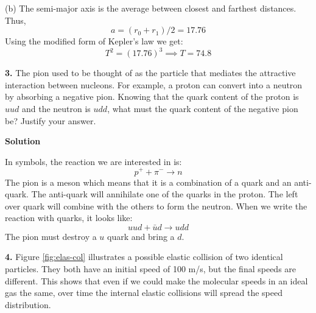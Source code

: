 \documentclass{article}
\begin{document}
(b) The semi-major axis is the average between closest and farthest
distances. Thus,
%
\begin{equation*}
a = (r_0 + r_1) / 2 = 17.76
\end{equation*}
Using the modified form of Kepler's law we get:
%
\begin{equation*}
T^2 = (17.76)^3 \implies T = 74.8
\end{equation*}

\textbf{3.}
\quad The pion used to be thought of as the particle that mediates the
attractive interaction between nucleons. For example, a proton can
convert into a neutron by absorbing a negative pion. Knowing that the
quark content of the proton is $uud$ and the neutron is
$udd$, what must the quark content of the negative pion be?
Justify your answer.
\par \textbf{Solution}
\par In symbols, the reaction we are interested in is:
%
\begin{equation*}
p^+ + \pi^- \rightarrow n
\end{equation*}
The pion is a meson which means that it is a combination of a quark and
an anti-quark. The anti-quark will annihilate one of the quarks in the
proton. The left over quark will combine with the others to form the
neutron. When we write the reaction with quarks, it looks like:
%
\begin{equation*}
uud + \bar{u}d \rightarrow udd
\end{equation*}
The pion must destroy a $u$ quark and bring a $d$.

\textbf{4.}
\quad Figure \hyperref[fig:elas-col]{\ref*{fig:elas-col}} illustrates a possible elastic collision
of two identical particles. They both have an initial speed of
100 m/s, but the final speeds are different. This shows that even
if we could make the molecular speeds in an ideal gas the same,
over time the internal elastic collisions will spread the speed
distribution.
\end{document}
